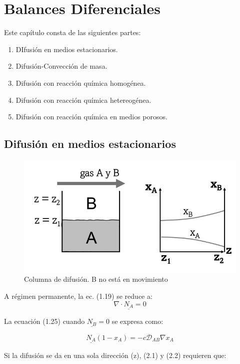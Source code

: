 \chapter{Balances Diferenciales}
Este capítulo consta de las siguientes partes:
\begin{enumerate}
	\item DIfusión en medios estacionarios.
	\item Difusión-Convección de masa.
	\item Difusión con reacción química homogénea.
	\item Difusión con reacción química hetereogénea.
	\item Difusión con reacción química en medios porosos.
\end{enumerate}

\section{Difusión en medios estacionarios}

\begin{figure}[H]
	\centering 
	\includegraphics[scale=0.5]{./Capitulo2/Imagenes/fig-2-1.png}
	\caption{Columna de difusión. B no está en movimiento}
\end{figure}

A régimen permanente, la ec. (1.19) se reduce a:
\begin{equation}
\nabla \cdot \underline{N_A} = 0
\end{equation}

La ecuación (1.25) cuando $\underline{N_B} = 0$ se expresa como:

\begin{equation}
\underline{N_A} (1-x_A) = - c \mathcal{D}_{AB} \nabla x_A
\end{equation}

Si la difusión se da en una sola dirección (z), (2.1) y (2.2) requieren que:

